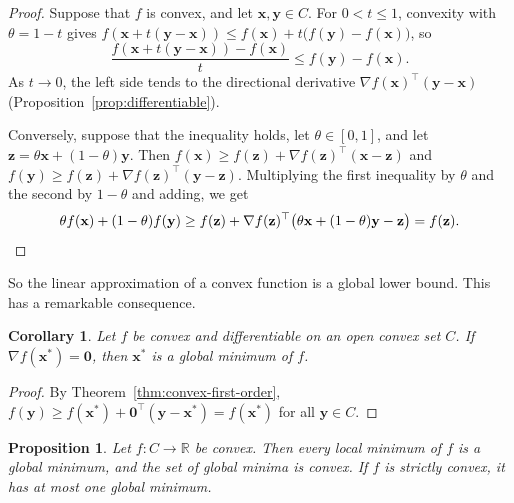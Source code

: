 \documentclass[11pt]{article}
\theoremstyle{definition}
\theoremstyle{plain}
\newtheorem{proposition}[definition]{Proposition}
\newtheorem{corollary}[definition]{Corollary}
\theoremstyle{remark}
\begin{document}
\begin{proof}
    Suppose that $f$ is convex, and let $\mathbf{x}, \mathbf{y} \in C$. For $0 < t \leq 1$, convexity with $\theta = 1 - t$ gives $f(\mathbf{x} + t(\mathbf{y} - \mathbf{x})) \leq f(\mathbf{x}) + t\big(f(\mathbf{y}) - f(\mathbf{x})\big)$, so
    \[\frac{f(\mathbf{x} + t(\mathbf{y} - \mathbf{x})) - f(\mathbf{x})}{t} \leq f(\mathbf{y}) - f(\mathbf{x}).\]
    As $t \to 0$, the left side tends to the directional derivative $\nabla f(\mathbf{x})^\top(\mathbf{y} - \mathbf{x})$ (Proposition~\ref{prop:differentiable}).

    Conversely, suppose that the inequality holds, let $\theta \in [0, 1]$, and let $\mathbf{z} = \theta\mathbf{x} + (1 - \theta)\mathbf{y}$. Then $f(\mathbf{x}) \geq f(\mathbf{z}) + \nabla f(\mathbf{z})^\top(\mathbf{x} - \mathbf{z})$ and $f(\mathbf{y}) \geq f(\mathbf{z}) + \nabla f(\mathbf{z})^\top(\mathbf{y} - \mathbf{z})$. Multiplying the first inequality by $\theta$ and the second by $1 - \theta$ and adding, we get
    \[\theta f(\mathbf{x}) + (1 - \theta)f(\mathbf{y}) \geq f(\mathbf{z}) + \nabla f(\mathbf{z})^\top\big(\theta\mathbf{x} + (1 - \theta)\mathbf{y} - \mathbf{z}\big) = f(\mathbf{z}).\qedhere\]
\end{proof}

So the linear approximation of a convex function is a global lower bound. This has a remarkable consequence.

\begin{corollary}\label{cor:convex-global}
    Let $f$ be convex and differentiable on an open convex set $C$. If $\nabla f(\mathbf{x}^*) = \mathbf{0}$, then $\mathbf{x}^*$ is a global minimum of $f$.
\end{corollary}

\begin{proof}
    By Theorem~\ref{thm:convex-first-order}, $f(\mathbf{y}) \geq f(\mathbf{x}^*) + \mathbf{0}^\top(\mathbf{y} - \mathbf{x}^*) = f(\mathbf{x}^*)$ for all $\mathbf{y} \in C$.
\end{proof}

\begin{proposition}\label{prop:convex-minima}
    Let $f: C \to \mathbb{R}$ be convex. Then every local minimum of $f$ is a global minimum, and the set of global minima is convex. If $f$ is strictly convex, it has at most one global minimum.
\end{proposition}
\end{document}
